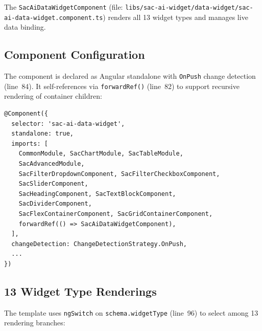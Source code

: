 \documentclass[11pt]{article}
\begin{document}
The \texttt{SacAiDataWidgetComponent} (file:
\texttt{libs/sac-ai-widget/data-widget/sac-ai-data-widget.component.ts}) renders
all 13 widget types and manages live data binding.

\subsection{Component Configuration}

The component is declared as Angular standalone with \texttt{OnPush} change
detection (line~84). It self-references via \texttt{forwardRef()} (line~82) to
support recursive rendering of container children:

\begin{lstlisting}[language={[Sharp]C},caption={Component metadata (sac-ai-data-widget.component.ts:66--84)}]
@Component({
  selector: 'sac-ai-data-widget',
  standalone: true,
  imports: [
    CommonModule, SacChartModule, SacTableModule,
    SacAdvancedModule,
    SacFilterDropdownComponent, SacFilterCheckboxComponent,
    SacSliderComponent,
    SacHeadingComponent, SacTextBlockComponent,
    SacDividerComponent,
    SacFlexContainerComponent, SacGridContainerComponent,
    forwardRef(() => SacAiDataWidgetComponent),
  ],
  changeDetection: ChangeDetectionStrategy.OnPush,
  ...
})
\end{lstlisting}

\subsection{13 Widget Type Renderings}

The template uses \texttt{ngSwitch} on \texttt{schema.widgetType} (line~96) to
select among 13 rendering branches:
\end{document}
